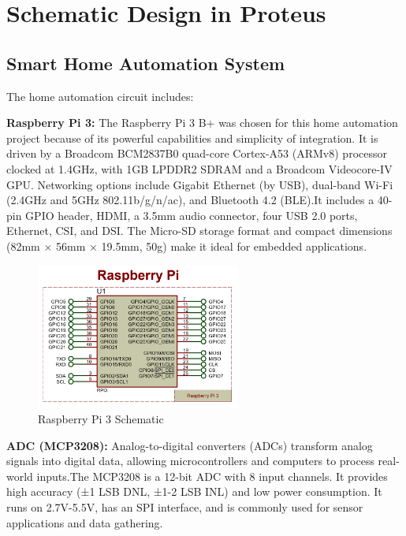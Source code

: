 \documentclass[a4paper,12pt]{report}
\begin{document}
\section{Schematic Design in Proteus}
\subsection{Smart Home Automation System}
The home automation circuit includes:

\textbf{Raspberry Pi 3:} The Raspberry Pi 3 B+ was chosen for this home automation project because of its powerful capabilities and simplicity of integration.  It is driven by a Broadcom BCM2837B0 quad-core Cortex-A53 (ARMv8) processor clocked at 1.4GHz, with 1GB LPDDR2 SDRAM and a Broadcom Videocore-IV GPU. Networking options include Gigabit Ethernet (by USB), dual-band Wi-Fi (2.4GHz and 5GHz 802.11b/g/n/ac), and Bluetooth 4.2 (BLE)\cite{valov2020home}.It includes a 40-pin GPIO header, HDMI, a 3.5mm audio connector, four USB 2.0 ports, Ethernet, CSI, and DSI.  The Micro-SD storage format and compact dimensions (82mm × 56mm × 19.5mm, 50g) make it ideal for embedded applications\cite{valov2020home}.

\begin{figure}[H]  %
    \centering
    \includegraphics[width=0.6\textwidth]{image.png} %
    \caption{Raspberry Pi 3 Schematic}
    \label{fig:Raspberry} %
\end{figure}


\textbf{ADC (MCP3208):} Analog-to-digital converters (ADCs) transform analog signals into digital data, allowing microcontrollers and computers to process real-world inputs.The MCP3208 is a 12-bit ADC with 8 input channels. It provides high accuracy (±1 LSB DNL, ±1-2 LSB INL) and low power consumption.  It runs on 2.7V-5.5V, has an SPI interface, and is commonly used for sensor applications and data gathering.
\end{document}
